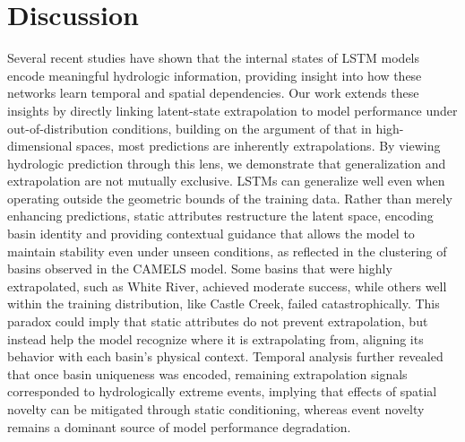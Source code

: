 \documentclass{article}
\begin{document}
\section{Discussion}

Several recent studies  \cite{Lees2021}\cite{Kratzert2019pub}\cite{Kratzert2019universal} have shown that the internal states of LSTM models encode meaningful hydrologic information, providing insight into how these networks learn temporal and spatial dependencies. Our work extends these insights by directly linking latent-state extrapolation to model performance under out-of-distribution conditions, building on the argument of \cite{balestriero2021learning} that in high-dimensional spaces, most predictions are inherently extrapolations. By viewing hydrologic prediction through this lens, we demonstrate that generalization and extrapolation are not mutually exclusive. LSTMs can generalize well even when operating outside the geometric bounds of the training data. Rather than merely enhancing predictions, static attributes restructure the latent space, encoding basin identity and providing contextual guidance that allows the model to maintain stability even under unseen conditions, as reflected in the clustering of basins observed in the CAMELS model. Some basins that were highly extrapolated, such as White River, achieved moderate success, while others well within the training distribution, like Castle Creek, failed catastrophically. This paradox could imply that static attributes do not prevent extrapolation, but instead help the model recognize where it is extrapolating from, aligning its behavior with each basin’s physical context. Temporal analysis further revealed that once basin uniqueness was encoded, remaining extrapolation signals corresponded to hydrologically extreme events, implying that effects of spatial novelty can be mitigated through static conditioning, whereas event novelty remains a dominant source of model performance degradation.
\end{document}
